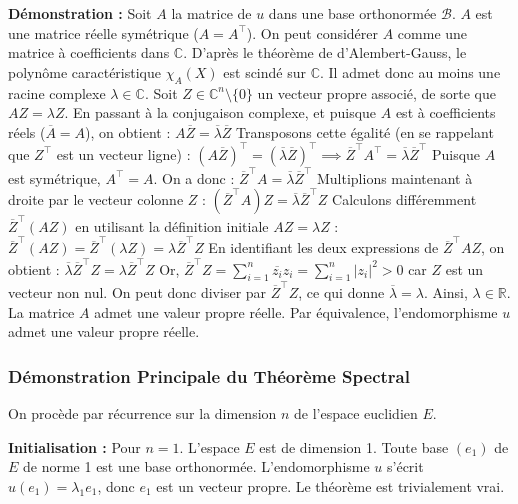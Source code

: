 \documentclass[11pt,a4paper]{article}
\begin{document}
\textbf{Démonstration :}
Soit $A$ la matrice de $u$ dans une base orthonormée $\mathcal{B}$. $A$ est une matrice réelle symétrique ($A = A^\top$).
On peut considérer $A$ comme une matrice à coefficients dans $\mathbb{C}$. D'après le théorème de d'Alembert-Gauss, le polynôme caractéristique $\chi_A(X)$ est scindé sur $\mathbb{C}$. Il admet donc au moins une racine complexe $\lambda \in \mathbb{C}$.
Soit $Z \in \mathbb{C}^n \setminus \{0\}$ un vecteur propre associé, de sorte que $AZ = \lambda Z$.
En passant à la conjugaison complexe, et puisque $A$ est à coefficients réels ($\overline{A} = A$), on obtient :
$A \overline{Z} = \overline{\lambda} \overline{Z}$
Transposons cette égalité (en se rappelant que $Z^\top$ est un vecteur ligne) :
$(A \overline{Z})^\top = (\overline{\lambda} \overline{Z})^\top \implies \overline{Z}^\top A^\top = \overline{\lambda} \overline{Z}^\top$
Puisque $A$ est symétrique, $A^\top = A$. On a donc :
$\overline{Z}^\top A = \overline{\lambda} \overline{Z}^\top$
Multiplions maintenant à droite par le vecteur colonne $Z$ :
$(\overline{Z}^\top A) Z = \overline{\lambda} \overline{Z}^\top Z$
Calculons différemment $\overline{Z}^\top (AZ)$ en utilisant la définition initiale $AZ = \lambda Z$ :
$\overline{Z}^\top (AZ) = \overline{Z}^\top (\lambda Z) = \lambda \overline{Z}^\top Z$
En identifiant les deux expressions de $\overline{Z}^\top A Z$, on obtient :
$\overline{\lambda} \overline{Z}^\top Z = \lambda \overline{Z}^\top Z$
Or, $\overline{Z}^\top Z = \sum_{i=1}^n \overline{z_i} z_i = \sum_{i=1}^n |z_i|^2 > 0$ car $Z$ est un vecteur non nul.
On peut donc diviser par $\overline{Z}^\top Z$, ce qui donne $\overline{\lambda} = \lambda$.
Ainsi, $\lambda \in \mathbb{R}$. La matrice $A$ admet une valeur propre réelle. Par équivalence, l'endomorphisme $u$ admet une valeur propre réelle.

\subsubsection{Démonstration Principale du Théorème Spectral}

On procède par récurrence sur la dimension $n$ de l'espace euclidien $E$.

\textbf{Initialisation :}
Pour $n = 1$. L'espace $E$ est de dimension 1. Toute base $(e_1)$ de $E$ de norme 1 est une base orthonormée. L'endomorphisme $u$ s'écrit $u(e_1) = \lambda_1 e_1$, donc $e_1$ est un vecteur propre. Le théorème est trivialement vrai.
\end{document}

